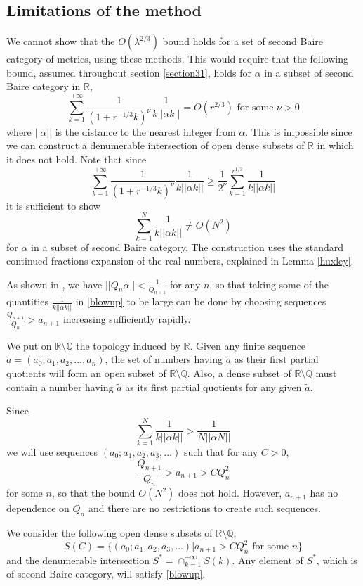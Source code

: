 \documentclass[12pt]{amsart}
\numberwithin{equation}{subsection}
\theoremstyle{definition}
\theoremstyle{plain}
\begin{document}
\subsection{Limitations of the method}
\label{limits}
We cannot show that the $O(\lambda^{2/3})$ bound holds for a set of second Baire category of metrics, using these methods.
This would require that the following bound, assumed throughout section \ref{section31}, holds for $\alpha$ in a subset of second Baire category in $\mathbb R$,
\[
\sum_{k=1}^{+\infty} \frac{1}{(1+r^{-1/3}k)^\nu} \frac{1}{k ||\alpha k||} = O(r^{2/3}) \text{ for some } \nu > 0
\]
where $|| \alpha ||$ is the distance to the nearest integer from $\alpha$.
This is impossible since we can construct a denumerable intersection of open dense subsets of $\mathbb R$
in which it does not hold.
Note that since
\[
\sum_{k=1}^{+\infty} \frac{1}{(1+r^{-1/3}k)^\nu} \frac{1}{k ||\alpha k||} \geq
\frac{1}{2^\nu} \sum_{k=1}^{r^{1/3}} \frac{1}{k ||\alpha k||}
\]
it is sufficient to show
\begin{equation}
\label{blowup}
\sum_{k=1}^{N} \frac{1}{k ||\alpha k||} \neq O(N^2)
\end{equation}
for $\alpha$ in a subset of second Baire category.
The construction uses the standard continued fractions expansion of the real numbers, explained in Lemma \ref{huxley}.

As shown in \cite{9}, we have $ || Q_n \alpha || < \frac{1}{Q_{n+1}}$ for any $n$, so that taking
some of the quantities $\frac{1}{k || \alpha k ||}$ in \eqref{blowup} to be large can be done by choosing sequences
$\frac{Q_{n+1}}{Q_n} > a_{n+1}$ increasing sufficiently rapidly.

We put on $\mathbb R \setminus \mathbb Q$ the topology induced by $\mathbb R$.
Given any finite sequence $\tilde{a}=(a_0;a_1,a_2,\dots,a_n)$, the set of numbers having $\tilde{a}$ as
their first partial quotients will form an open subset of $\mathbb R \setminus \mathbb Q$.
Also, a dense subset of $\mathbb R \setminus \mathbb Q$ must contain a number having $\tilde{a}$ as its
first partial quotients for any given $\tilde{a}$.

Since
\[
\sum_{k=1}^{N} \frac{1}{k ||\alpha k||} > \frac{1}{N || \alpha N ||}
\]
we will use sequences $(a_0;a_1,a_2,a_3,\dots)$ such that for any $C > 0$,
\[
\frac{Q_{n+1}}{Q_n} > a_{n+1} > C Q_n^2
\]
for some $n$, so that the bound $O(N^2)$ does not hold. However, $a_{n+1}$ has no dependence on $Q_n$ and there
are no restrictions to create such sequences.

We consider the following open dense subsets of $\mathbb R \setminus \mathbb Q$,
\[
S(C) = \{(a_0;a_1,a_2,a_3,\dots) | a_{n+1} > C Q_n^2 \text{ for some } n\}
\]
and the denumerable intersection $S^{*}=\cap_{k=1}^{+\infty} S(k)$. Any element of $S^{*}$, which is of second Baire category, will satisfy \eqref{blowup}.
\end{document}
